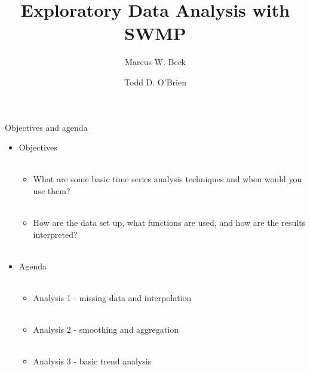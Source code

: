 \documentclass[xcolor=svgnames]{beamer}\usepackage[]{graphicx}\usepackage[]{color}
\begin{document}
\title[Exploratory Data Analysis]{Exploratory Data Analysis with SWMP}

\author[M. Beck, T. O'Brien]{Marcus W. Beck \and Todd D. O'Brien}

\date{}







\begin{frame}{Objectives and agenda}
\begin{itemize}
\onslide<+->
\item Objectives \\~\\
\begin{itemize}
\item What are some basic time series analysis techniques and when would you use them? \\~\\
\item How are the data set up, what functions are used, and how are the results interpreted? \\~\\
\end{itemize}
\onslide<+->
\item Agenda \\~\\
\begin{itemize}
\item Analysis 1 - missing data and interpolation\\~\\
\item Analysis 2 - smoothing and aggregation \\~\\
\item Analysis 3 - basic trend analysis\\~\\
\end{itemize}
\end{itemize}
\end{frame}
\end{document}
